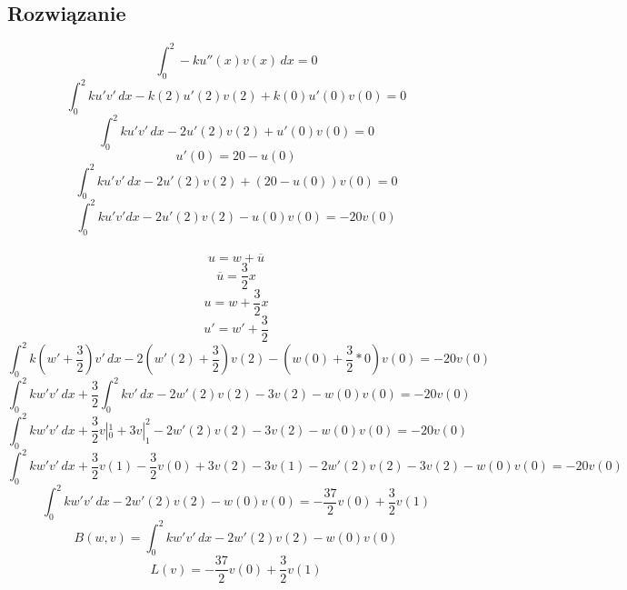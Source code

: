 \documentclass{article}
\begin{document}
\subsection{Rozwiązanie}
\begin{equation*}
    \int_0^2-k u''(x) v(x) \, dx = 0
\end{equation*}
\begin{equation*}
    \int_0^2ku'v'\,dx-k(2)u'(2)v(2)+k(0)u'(0)v(0)=0
\end{equation*}
\begin{equation}
    \int_0^2ku'v'\,dx - 2u'(2)v(2)+u'(0)v(0)=0
    \label{caleczka}
\end{equation}
\begin{equation*}
    u'(0)=20-u(0)
\end{equation*}
\begin{equation*}
    \int_0^2ku'v'\,dx - 2u'(2)v(2) + (20-u(0))v(0)=0
\end{equation*}
\begin{equation}
    \int_0^2ku'v'dx - 2u'(2)v(2) - u(0)v(0)=-20v(0)
    \label{eq:cal}
\end{equation}
\\
\begin{equation*}
    u=w+\overline{u}
\end{equation*}
\begin{equation*}
    \overline{u}=\frac{3}{2}x
\end{equation*}
\begin{equation}
    u = w + \frac{3}{2}x
\end{equation}
\begin{equation}
    u' = w' + \frac{3}{2}
\end{equation}
\begin{equation*}
    \int_0^2k(w'+\frac{3}{2})v'\,dx - 2(w'(2)+\frac{3}{2})v(2) - (w(0)+\frac{3}{2}*0)v(0)=-20v(0)
\end{equation*}
\begin{equation*}
    \int_0^2kw'v'\,dx + \frac{3}{2}\int_0^2kv'\,dx - 2w'(2)v(2)-3v(2) - w(0)v(0)=-20v(0)
\end{equation*}
\begin{equation*}
    \int_0^2kw'v'\,dx + \frac{3}{2}v|_0^1 + 3v|_1^2 - 2w'(2)v(2)-3v(2) - w(0)v(0)=-20v(0)
\end{equation*}
\begin{equation*}
    \int_0^2kw'v'\,dx + \frac{3}{2}v(1) - \frac{3}{2}v(0) + 3v(2) - 3v(1) - 2w'(2)v(2)-3v(2) - w(0)v(0)=-20v(0)
\end{equation*}
\begin{equation*}
    \int_0^2kw'v'\,dx - 2w'(2)v(2) - w(0)v(0)=-\frac{37}{2}v(0) + \frac{3}{2}v(1)
\end{equation*}
\begin{equation}
    B(w,v) = \int_0^2kw'v'\,dx - 2w'(2)v(2) - w(0)v(0)
\end{equation}
\begin{equation}
    L(v) = -\frac{37}{2}v(0) + \frac{3}{2}v(1)
\end{equation}
\end{document}
